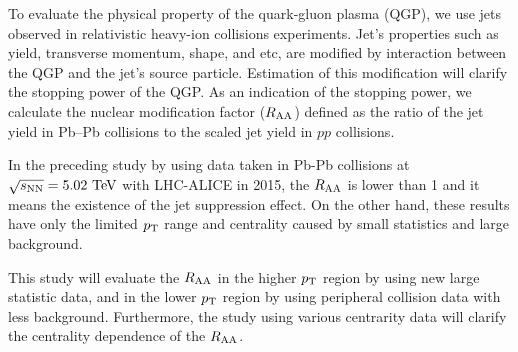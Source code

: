 To evaluate the physical property of the quark-gluon plasma (QGP),
we use jets observed in relativistic heavy-ion collisions experiments.
Jet's properties such as yield, transverse momentum, shape, and etc,
are modified by interaction between the QGP and the jet's source particle.
Estimation of this modification will clarify the stopping power of the QGP.
As an indication of the stopping power, 
we calculate the nuclear modification factor ($\raa$) defined 
as the ratio of the jet yield in Pb–Pb collisions to the scaled jet yield in $pp$ collisions.

In the preceding study\cite{Osada:2019oor} by using data 
taken in Pb-Pb collisions at $\cmeNN = 5.02~\TeV$ with LHC-ALICE in 2015,
the $\raa$ is lower than 1 and it means the existence of the jet suppression effect.
On the other hand, these results have only the limited $\pt$ range and centrality 
caused by small statistics and large background.

This study will evaluate the $\raa$ in the higher $\pt$ region 
by using new large statistic data, and in the lower $\pt$ region 
by using peripheral collision data with less background.
Furthermore, the study using various centrarity data 
will clarify the centrality dependence of the $\raa$.
